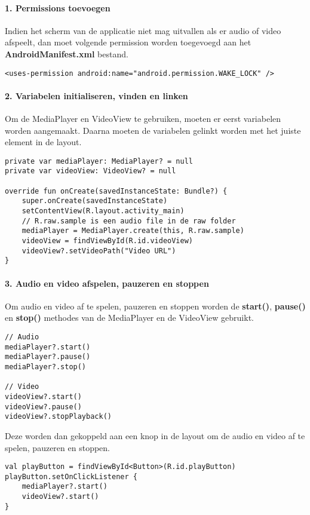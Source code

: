 \paragraph{1. Permissions toevoegen}
Indien het scherm van de applicatie niet mag uitvallen als er 
audio of video afspeelt, dan moet volgende permission worden toegevoegd aan het 
\textbf{AndroidManifest.xml} bestand.
\begin{verbatim}
<uses-permission android:name="android.permission.WAKE_LOCK" />
\end{verbatim}

\paragraph{2. Variabelen initialiseren, vinden en linken}
Om de MediaPlayer en VideoView te gebruiken, moeten er eerst variabelen 
worden aangemaakt. Daarna moeten de variabelen gelinkt worden met het juiste element in de layout.
\begin{verbatim}
private var mediaPlayer: MediaPlayer? = null
private var videoView: VideoView? = null

override fun onCreate(savedInstanceState: Bundle?) {
    super.onCreate(savedInstanceState)
    setContentView(R.layout.activity_main)
    // R.raw.sample is een audio file in de raw folder
    mediaPlayer = MediaPlayer.create(this, R.raw.sample)
    videoView = findViewById(R.id.videoView)
    videoView?.setVideoPath("Video URL")
}
\end{verbatim}

\paragraph{3. Audio en video afspelen, pauzeren en stoppen}
Om audio en video af te spelen, pauzeren en stoppen worden de 
\textbf{start()}, \textbf{pause()} en \textbf{stop()} methodes van de
MediaPlayer en de VideoView gebruikt.
\begin{verbatim}
// Audio
mediaPlayer?.start()
mediaPlayer?.pause()
mediaPlayer?.stop()

// Video
videoView?.start()
videoView?.pause()
videoView?.stopPlayback()
\end{verbatim}
Deze worden dan gekoppeld aan een knop in de layout om de audio en video
af te spelen, pauzeren en stoppen.
\begin{verbatim}
val playButton = findViewById<Button>(R.id.playButton)
playButton.setOnClickListener {
    mediaPlayer?.start()
    videoView?.start()
}
\end{verbatim}

